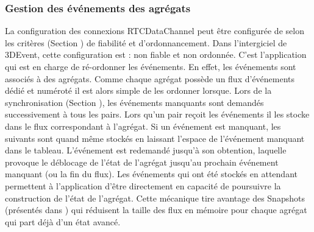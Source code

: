 


\subsubsection{Gestion des événements des agrégats}

La configuration des connexions RTCDataChannel peut être configurée de selon 
les critères (Section ) de fiabilité et d'ordonnancement. 
Dans l'intergiciel de 3DEvent, cette configuration est : non fiable et non ordonnée. 
C'est l'application qui est en charge de \og ré-ordonner\fg{} les événements. En 
effet, les événements sont associés à des agrégats. Comme chaque agrégat 
possède un flux d'événements dédié et numéroté il est alors simple de les 
ordonner lorsque. 
Lors de la synchronisation (Section ), les 
événements manquants sont demandés successivement à tous les pairs. Lors 
qu'un pair reçoit les événements il les stocke dans le flux correspondant à 
l'agrégat. Si un événement est manquant, les suivants sont quand même stockés 
en laissant l'espace de l'événement manquant dans le tableau. L'événement est 
redemandé jusqu'à son obtention, laquelle provoque le déblocage de l'état de 
l'agrégat jusqu'au prochain événement manquant (ou la fin du flux). Les 
événements qui ont été stockés \og en attendant\fg{} permettent à l'application 
d'être directement en capacité de poursuivre la construction de l'état de l'agrégat. 
Cette mécanique tire avantage des Snapshots (présentés dans ) 
qui réduisent la taille des flux en mémoire pour chaque agrégat qui part déjà d'un 
état avancé.

